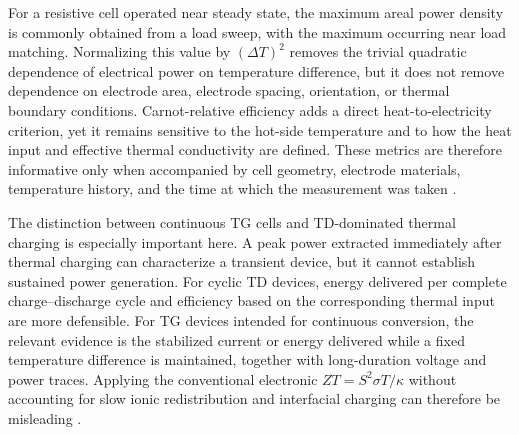 \documentclass[a4paper,12pt]{report}
\begin{document}
For a resistive cell operated near steady state, the maximum areal power density
is commonly obtained from a load sweep, with the maximum occurring near load
matching. Normalizing this value by $(\Delta T)^2$ removes the trivial
quadratic dependence of electrical power on temperature difference, but it does
not remove dependence on electrode area, electrode spacing, orientation, or
thermal boundary conditions. Carnot-relative efficiency adds a direct
heat-to-electricity criterion, yet it remains sensitive to the hot-side
temperature and to how the heat input and effective thermal conductivity are
defined. These metrics are therefore informative only when accompanied by cell
geometry, electrode materials, temperature history, and the time at which the
measurement was taken \citep{duan2021liquid}.

The distinction between continuous TG cells and TD-dominated thermal charging
is especially important here. A peak power extracted immediately after thermal
charging can characterize a transient device, but it cannot establish sustained
power generation. For cyclic TD devices, energy delivered per complete
charge--discharge cycle and efficiency based on the corresponding thermal input
are more defensible. For TG devices intended for continuous conversion, the
relevant evidence is the stabilized current or energy delivered while a fixed
temperature difference is maintained, together with long-duration voltage and
power traces. Applying the conventional electronic
$ZT=S^2\sigma T/\kappa$ without accounting for slow ionic redistribution and
interfacial charging can therefore be misleading
\citep{jabeen2024recent,xu2026birdseye}.
\end{document}
